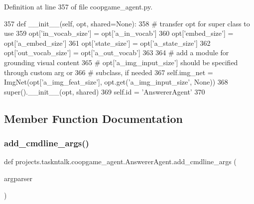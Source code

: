 Definition at line 357 of file coopgame\+\_\+agent.\+py.


\begin{DoxyCode}
357     \textcolor{keyword}{def }\_\_init\_\_(self, opt, shared=None):
358         \textcolor{comment}{# transfer opt for super class to use}
359         opt[\textcolor{stringliteral}{'in\_vocab\_size'}] = opt[\textcolor{stringliteral}{'a\_in\_vocab'}]
360         opt[\textcolor{stringliteral}{'embed\_size'}] = opt[\textcolor{stringliteral}{'a\_embed\_size'}]
361         opt[\textcolor{stringliteral}{'state\_size'}] = opt[\textcolor{stringliteral}{'a\_state\_size'}]
362         opt[\textcolor{stringliteral}{'out\_vocab\_size'}] = opt[\textcolor{stringliteral}{'a\_out\_vocab'}]
363 
364         \textcolor{comment}{# add a module for grounding visual content}
365         \textcolor{comment}{# opt['a\_img\_input\_size'] should be specified through custom arg or}
366         \textcolor{comment}{# subclass, if needed}
367         self.img\_net = ImgNet(opt[\textcolor{stringliteral}{'a\_img\_feat\_size'}], opt.get(\textcolor{stringliteral}{'a\_img\_input\_size'}, \textcolor{keywordtype}{None}))
368         super().\_\_init\_\_(opt, shared)
369         self.id = \textcolor{stringliteral}{'AnswererAgent'}
370 
\end{DoxyCode}


\subsection{Member Function Documentation}
\mbox{\label{classprojects_1_1taskntalk_1_1coopgame__agent_1_1AnswererAgent_a41be165d9cb3245e1f41be573020308e}} 
\subsubsection{\texorpdfstring{add\+\_\+cmdline\+\_\+args()}{add\_cmdline\_args()}}
{\footnotesize\ttfamily def projects.\+taskntalk.\+coopgame\+\_\+agent.\+Answerer\+Agent.\+add\+\_\+cmdline\+\_\+args (\begin{DoxyParamCaption}\item[{}]{argparser }\end{DoxyParamCaption})\hspace{0.3cm}{\ttfamily [static]}}

